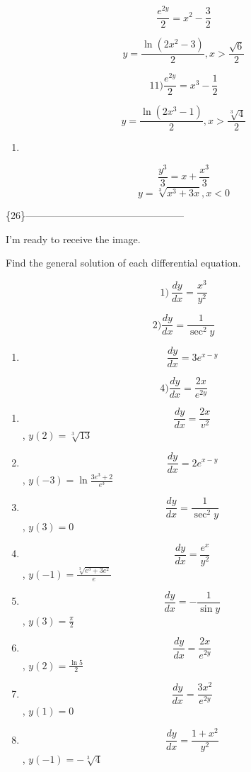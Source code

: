 \documentclass[
]{article}
\providecommand{\tightlist}{%
  \setlength{\itemsep}{0pt}\setlength{\parskip}{0pt}}
\begin{document}
\[\frac{e^{2y}}{2} = x^2 - \frac{3}{2}\]

\[y = \frac{\ln(2x^2 - 3)}{2}, x > \frac{\sqrt{6}}{2}\]

\[11) \frac{e^{2y}}{2} = x^3 - \frac{1}{2}\]

\[y = \frac{\ln(2x^3 - 1)}{2}, x > \frac{\sqrt[3]{4}}{2}\]

\begin{enumerate}
\def\labelenumi{\arabic{enumi})}
\setcounter{enumi}{11}
\tightlist
\item
\end{enumerate}

\[\frac{y^3}{3} = x + \frac{x^3}{3}\] \[y = \sqrt[3]{x^3 + 3x}, x < 0\]

\{26\}------------------------------------------------

I'm ready to receive the image.

Find the general solution of each differential equation.

\[1) \ \frac{dy}{dx} = \frac{x^3}{y^2}\]

\[2) \frac{dy}{dx} = \frac{1}{\sec^2 y}\]

\begin{enumerate}
\def\labelenumi{\arabic{enumi})}
\setcounter{enumi}{2}
\tightlist
\item
  \[\frac{dy}{dx} = 3e^{x-y}\]
\end{enumerate}

\[4) \frac{dy}{dx} = \frac{2x}{e^{2y}}\]

\begin{enumerate}
\def\labelenumi{\arabic{enumi})}
\setcounter{enumi}{4}
\item
  \[\frac{dy}{dx} = \frac{2x}{v^2}\] , \(y(2) = \sqrt[3]{13}\)
\item
  \[\frac{dy}{dx} = 2e^{x-y}\] , \(y(-3) = \ln \frac{3e^3 + 2}{e^3}\)
\item
  \[\frac{dy}{dx} = \frac{1}{\sec^2 y}\] , \(y(3) = 0\)
\item
  \[\frac{dy}{dx} = \frac{e^x}{y^2}\] ,
  \(y(-1) = \frac{\sqrt[3]{e^3 + 3e^2}}{e}\)
\item
  \[\frac{dy}{dx} = -\frac{1}{\sin y}\] , \(y(3) = \frac{\pi}{2}\)
\item
  \[\frac{dy}{dx} = \frac{2x}{e^{2y}}\] , \(y(2) = \frac{\ln 5}{2}\)
\item
  \[\frac{dy}{dx} = \frac{3x^2}{e^{2y}}\] , \(y(1) = 0\)
\item
  \[\frac{dy}{dx} = \frac{1+x^2}{y^2}\] , \(y(-1) = -\sqrt[3]{4}\)
\end{enumerate}
\end{document}
